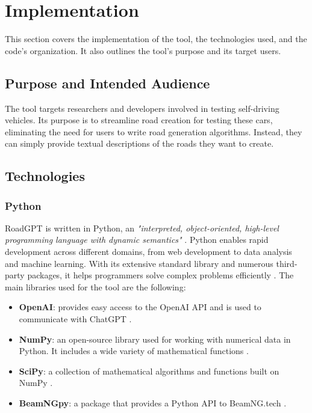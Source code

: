 \chapter{Implementation}
This section covers the implementation of the tool, the technologies used, and the code's organization. It also outlines the tool's purpose and its target users.

\section{Purpose and Intended Audience}
The tool targets researchers and developers involved in testing self-driving vehicles. Its purpose is to streamline road creation for testing these cars, eliminating the need for users to write road generation algorithms. Instead, they can simply provide textual descriptions of the roads they want to create.


\section{Technologies}
\subsection{Python}
RoadGPT is written in Python, an \textit{"interpreted, object-oriented, high-level programming language with dynamic semantics"} \cite{python}. Python enables rapid development across different domains, from web development to data analysis and machine learning. With its extensive standard library and numerous third-party packages, it helps programmers solve complex problems efficiently \cite{python}. The main libraries used for the tool are the following:

\begin{itemize}
    \item \textbf{OpenAI}: provides easy access to the OpenAI API and is used to communicate with ChatGPT \cite{OpenAI}.
    \item \textbf{NumPy}: an open-source library used for working with numerical data in Python. It includes a wide variety of mathematical functions \cite{NumPy}.
    \item \textbf{SciPy}: a collection of mathematical algorithms and functions built on NumPy \cite{SciPy}.
    \item \textbf{BeamNGpy}: a package that provides a Python API to BeamNG.tech \cite{BeamNGpy}.
\end{itemize}

